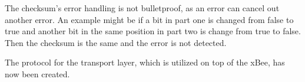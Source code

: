 The checksum's error handling is not bulletproof, as an error can cancel out another error. An example might be if a bit in part one is changed from false to true and another bit in the same position in part two is change from true to false. Then the checksum is the same and the error is not detected. 

The protocol for the transport layer, which is utilized on top of the xBee, has now been created.